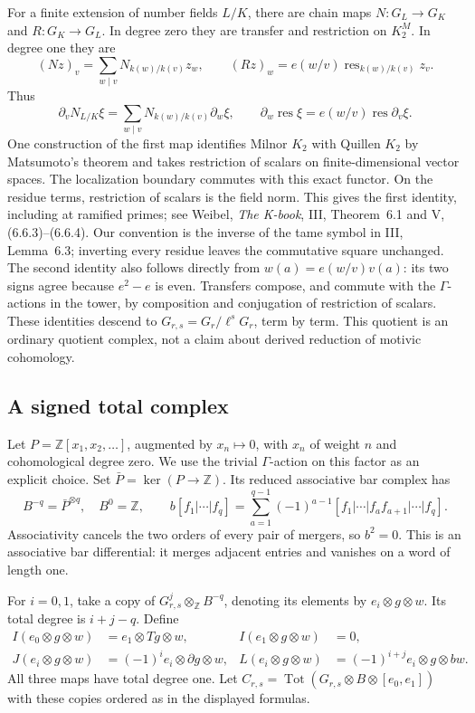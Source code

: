 For a finite extension of number fields \(L/K\), there are chain
maps \(N:G_L\to G_K\) and \(R:G_K\to G_L\). In degree zero they
are transfer and restriction on \(K_2^M\). In degree one they are
\[
 (Nz)_v=\sum_{w\mid v}N_{k(w)/k(v)}z_w,
 \qquad (Rz)_w=e(w/v)\operatorname{res}_{k(w)/k(v)}z_v.
\]
Thus
\begin{equation}\label{v4-arith:C2:norm-residue}
 \partial_v N_{L/K}\xi
 =\sum_{w\mid v}N_{k(w)/k(v)}\partial_w\xi,
 \qquad
 \partial_w\operatorname{res}\xi
 =e(w/v)\operatorname{res}\partial_v\xi.
\end{equation}
One construction of the first map identifies Milnor \(K_2\) with
Quillen \(K_2\) by Matsumoto's theorem and takes restriction of
scalars on finite-dimensional vector spaces. The localization
boundary commutes with this exact functor. On the residue terms,
restriction of scalars is the field norm. This gives the first
identity, including at ramified primes; see Weibel, \emph{The
K-book}, III, Theorem~6.1 and V, (6.6.3)--(6.6.4).
Our convention is the inverse of the tame symbol in III, Lemma~6.3;
inverting every residue leaves the commutative square unchanged.
The second identity also follows directly from
\(w(a)=e(w/v)v(a)\): its two signs agree because \(e^2-e\) is even.
Transfers compose, and commute with the \(\Gamma\)-actions in the
tower, by composition and conjugation of restriction of scalars.
These identities descend to \(G_{r,s}=G_r/\ell^sG_r\), term by term.
This quotient is an ordinary quotient complex, not a claim about
derived reduction of motivic cohomology.

\subsection{A signed total complex}

Let \(P=\mathbb Z[x_1,x_2,\ldots]\), augmented by \(x_n\mapsto0\),
with \(x_n\) of weight \(n\) and cohomological degree zero.
We use the trivial \(\Gamma\)-action on this factor as an explicit
choice. Set \(\bar P=\ker(P\to\mathbb Z)\). Its reduced associative
bar complex has
\[
 B^{-q}=\bar P^{\otimes q},\quad B^0=\mathbb Z,\qquad
 b[f_1|\cdots|f_q]
 =\sum_{a=1}^{q-1}(-1)^{a-1}
 [f_1|\cdots|f_af_{a+1}|\cdots|f_q].
\]
Associativity cancels the two orders of every pair of mergers, so
\(b^2=0\). This is an associative bar differential: it merges
adjacent entries and vanishes on a word of length one.

For \(i=0,1\), take a copy of
\(G_{r,s}^j\otimes_{\mathbb Z}B^{-q}\), denoting its elements by
\(e_i\otimes g\otimes w\). Its total degree is \(i+j-q\).
Define
\begin{align*}
 I(e_0\otimes g\otimes w)&=e_1\otimes Tg\otimes w,
 & I(e_1\otimes g\otimes w)&=0,\\
 J(e_i\otimes g\otimes w)&=(-1)^i e_i\otimes\partial g\otimes w,
 & L(e_i\otimes g\otimes w)&=(-1)^{i+j}e_i\otimes g\otimes bw.
\end{align*}
All three maps have total degree one. Let
\(C_{r,s}=\operatorname{Tot}(G_{r,s}\otimes B\otimes[e_0,e_1])\)
with these copies ordered as in the displayed formulas.

